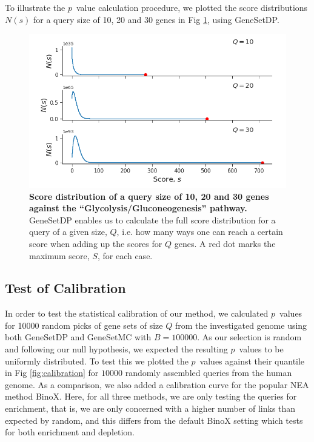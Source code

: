 \documentclass[10pt,letterpaper]{article}
\begin{document}
To illustrate the $p$~value calculation procedure, we plotted the score distributions $N(s)$ for a query size of 10, 20 and 30 genes in Fig \ref{fig:score_dist}, using GeneSetDP.

\begin{figure}[htb]
	\begin{center}
		\includegraphics[width=1.0\textwidth]{figures/score_distribuition_multiple.png}
    \end{center}
  \caption{{\bf Score distribution of a query size of 10, 20 and 30 genes against the ``Glycolysis/Gluconeogenesis'' pathway.} GeneSetDP enables us to calculate the full score distribution for a query of a given size, $Q$, i.e. how many ways one can reach a certain score when adding up the scores for $Q$ genes. A red dot marks the maximum score, $S$, for each case.}
  \label{fig:score_dist}
\end{figure}

\subsection*{Test of Calibration}

In order to test the statistical calibration of our method, we calculated $p$~values for 10000 random picks of gene sets of size $Q$ from the investigated genome using both GeneSetDP and GeneSetMC with $B = 100000$. As our selection is random and following our null hypothesis, we expected the resulting $p$~values to be uniformly distributed. To test this we plotted the $p$~values against their quantile in Fig \ref{fig:calibration} for $10000$ randomly assembled queries from the human genome. As a comparison, we also added a calibration curve for the popular NEA method BinoX\cite{ogris2016novel}. Here, for all three methods, we are only testing the queries for enrichment, that is, we are only concerned with a higher number of links than expected by random, and this differs from the default BinoX setting which tests for both enrichment and depletion.
\end{document}
